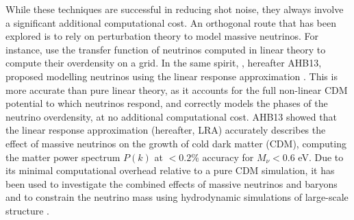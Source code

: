 \documentclass[useAMS, usenatbib]{mnras}
\begin{document}

While these techniques are successful in reducing shot noise, they always involve a significant additional computational cost. An orthogonal route that has been explored is to rely on perturbation theory to model massive neutrinos. For instance, \cite{Brandbyge_2009} use the transfer function of neutrinos computed in linear theory to compute their overdensity on a grid. In the same spirit, \cite{AHB}, hereafter AHB13, proposed modelling neutrinos using the linear response approximation \citep{Bond_1980, Ma_1994}. This is more accurate than pure linear theory, as it accounts for the full non-linear CDM potential to which neutrinos respond, and correctly models the phases of the neutrino overdensity, at no additional computational cost.
AHB13 showed that the linear response approximation (hereafter, LRA) accurately describes the effect of massive neutrinos on the growth of cold dark matter (CDM), computing the matter power spectrum $P(k)$ at $ < 0.2\%$ accuracy for $M_\nu < 0.6$ eV. Due to its minimal computational overhead relative to a pure CDM simulation, it has been used to investigate the combined effects of massive neutrinos and baryons \citep{Mummery_2017} and to constrain the neutrino mass using hydrodynamic simulations of large-scale structure \citep{McCarthy_2018, McCarthy_2017}.
\end{document}

